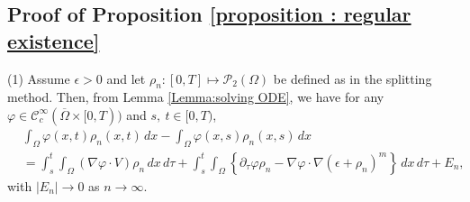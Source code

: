 \documentclass{amsart}
\numberwithin{equation}{section}
\newcommand{\calC}{{ \mathcal C  }}
\begin{document}
\subsection{Proof of Proposition \ref{proposition : regular existence}}
(1) Assume $\epsilon>0$ and let $\rho_n:[0,T]\mapsto \mathcal{P}_2(\Omega)$ be defined as in the splitting method. Then, from Lemma \ref{Lemma:solving
ODE}, we have
for any $\varphi \in \calC_c^\infty(\overline{\Omega} \times [0,T))$
and $s,~t \in [0,T)$,
\begin{equation}\label{eq3 : Theorem : Toy Fokker-Plank}
\begin{aligned}
& \int_{\Omega}\varphi(x,t) \rho_n(x,t)\,dx - \int_{\Omega}\varphi(x,s) \rho_n(x,s)\,dx\\
&= \int_{s}^{t} \int_{\Omega}   (\nabla   \varphi \cdot V) \rho_n
\,dx  \,d\tau + \int_{s}^{t} \int_{\Omega} \left\{
\partial_\tau\varphi  \rho_n -  \nabla \varphi \cdot
\nabla(\epsilon + \rho_n)^m\right\}\,dx \,d\tau
 + E_n,
\end{aligned}
\end{equation}
with $|E_n| \longrightarrow 0 $ as $n \rightarrow \infty$.
\end{document}
